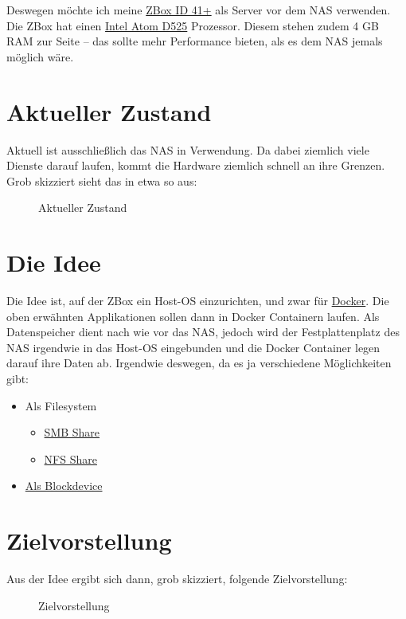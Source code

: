 \documentclass[12pt,a4paper]{article}
\newcommand{\jpaimg}[2]{\begin{figure}[H]\centering\fbox{\texttt{[image: \#1]}}\caption{#2}\label{fig:#2}\end{figure}}
\begin{document}
Deswegen möchte ich meine \href{https://www.zotac.com/us/product/mini_pcs/id41-plus}{ZBox ID 41+} als Server vor dem
NAS verwenden. Die ZBox hat einen \href{https://de.wikipedia.org/wiki/Intel_Atom}{Intel Atom D525} Prozessor. Diesem
stehen zudem 4 GB RAM zur Seite -- das sollte mehr Performance bieten, als es dem NAS jemals möglich wäre.

\section{Aktueller Zustand}
Aktuell ist ausschließlich das NAS in Verwendung. Da dabei ziemlich viele Dienste darauf laufen, kommt die Hardware
ziemlich schnell an ihre Grenzen. Grob skizziert sieht das in etwa so aus:

\jpaimg{./images/DS411Slim.png}{Aktueller Zustand}

\section{Die Idee}
Die Idee ist, auf der ZBox ein Host-OS einzurichten, und zwar für
\href{https://de.wikipedia.org/wiki/Docker_(Software)}{Docker}. Die oben erwähnten Applikationen sollen dann in Docker
Containern laufen. Als Datenspeicher dient nach wie vor das NAS, jedoch wird der Festplattenplatz des NAS irgendwie
in das Host-OS eingebunden und die Docker Container legen darauf ihre Daten ab. Irgendwie deswegen, da es ja
verschiedene Möglichkeiten gibt:

\begin{itemize}
    \item Als Filesystem
    \begin{itemize}
        \item \href{https://de.wikipedia.org/wiki/Server_Message_Block}{SMB Share}
        \item \href{https://de.wikipedia.org/wiki/Network_File_System}{NFS Share}
    \end{itemize}
    \item \href{https://de.wikipedia.org/wiki/ISCSI}{Als Blockdevice}
\end{itemize}

\section{Zielvorstellung}
Aus der Idee ergibt sich dann, grob skizziert, folgende Zielvorstellung:

\jpaimg{./images/ZBoxDS411Slim.png}{Zielvorstellung}
\end{document}
